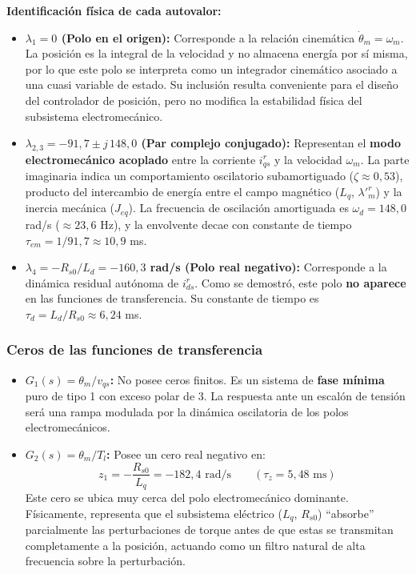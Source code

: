 \documentclass[12pt, a4paper,journal, onecolumn, compsoc]{IEEEtran}
\begin{document}
\textbf{Identificación física de cada autovalor:} \mbox{}

\begin{itemize}
    \item \textbf{$\lambda_1 = 0$ (Polo en el origen):} Corresponde a la relación cinemática $\dot{\theta}_m = \omega_m$. La posición es la integral de la velocidad y no almacena energía por sí misma, por lo que este polo se interpreta como un integrador cinemático asociado a una cuasi variable de estado. Su inclusión resulta conveniente para el diseño del controlador de posición, pero no modifica la estabilidad física del subsistema electromecánico.

    \item \textbf{$\lambda_{2,3} = -91{,}7 \pm j\,148{,}0$ (Par complejo conjugado):} Representan el \textbf{modo electromecánico acoplado} entre la corriente $i_{qs}^r$ y la velocidad $\omega_m$. La parte imaginaria indica un comportamiento oscilatorio subamortiguado ($\zeta \approx 0{,}53$), producto del intercambio de energía entre el campo magnético ($L_q$, $\lambda'^r_m$) y la inercia mecánica ($J_{eq}$). La frecuencia de oscilación amortiguada es $\omega_d = 148{,}0$ rad/s ($\approx 23{,}6$ Hz), y la envolvente decae con constante de tiempo $\tau_{em} = 1/91{,}7 \approx 10{,}9$ ms.

    \item \textbf{$\lambda_4 = -R_{s0}/L_d = -160{,}3$ rad/s (Polo real negativo):} Corresponde a la dinámica residual autónoma de $i_{ds}^r$. Como se demostró, este polo \textbf{no aparece} en las funciones de transferencia. Su constante de tiempo es $\tau_d = L_d/R_{s0} \approx 6{,}24$ ms.
\end{itemize}

\subsubsection{Ceros de las funciones de transferencia}

\begin{itemize}
    \item \textbf{$G_1(s) = \theta_m / v_{qs}$:} No posee ceros finitos. Es un sistema de \textbf{fase mínima} puro de tipo 1 con exceso polar de 3. La respuesta ante un escalón de tensión será una rampa modulada por la dinámica oscilatoria de los polos electromecánicos.

    \item \textbf{$G_2(s) = \theta_m / T_l$:} Posee un cero real negativo en:
    \begin{equation}
        z_1 = -\frac{R_{s0}}{L_q} = -182{,}4 \text{ rad/s} \qquad (\tau_z = 5{,}48 \text{ ms})
    \end{equation}
    Este cero se ubica muy cerca del polo electromecánico dominante. Físicamente, representa que el subsistema eléctrico ($L_q$, $R_{s0}$) ``absorbe'' parcialmente las perturbaciones de torque antes de que estas se transmitan completamente a la posición, actuando como un filtro natural de alta frecuencia sobre la perturbación.
\end{itemize}
\end{document}
